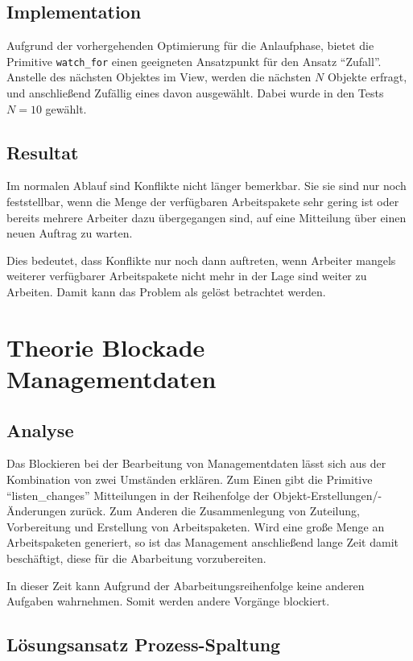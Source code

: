 \subsection{Implementation}

Aufgrund der vorhergehenden Optimierung für die Anlaufphase,
bietet die Primitive \verb|watch_for| einen geeigneten Ansatzpunkt für den Ansatz ``Zufall''.
Anstelle des nächsten Objektes im View, werden die nächsten $N$ Objekte erfragt,
und anschließend Zufällig eines davon ausgewählt.
Dabei wurde in den Tests $N = 10$ gewählt.

\subsection{Resultat}
Im normalen Ablauf sind Konflikte nicht länger bemerkbar.
Sie sie sind nur noch feststellbar, wenn die Menge der verfügbaren Arbeitspakete
sehr gering ist oder bereits mehrere Arbeiter dazu übergegangen sind,
auf eine Mitteilung über einen neuen Auftrag zu warten.

Dies bedeutet, dass Konflikte nur noch dann auftreten,
wenn Arbeiter mangels weiterer verfügbarer Arbeitspakete nicht mehr in der Lage sind weiter zu Arbeiten. Damit kann das Problem als gelöst betrachtet werden.

\section{Theorie Blockade Managementdaten}
\subsection{Analyse}
Das Blockieren bei der Bearbeitung von Managementdaten lässt sich
aus der Kombination von zwei Umständen erklären.
Zum Einen gibt die Primitive ``listen\_changes'' Mitteilungen
in der Reihenfolge der Objekt-Erstellungen/-Änderungen zurück.
Zum Anderen die Zusammenlegung von Zuteilung, Vorbereitung
und Erstellung von Arbeitspaketen.
Wird eine große Menge an Arbeitspaketen generiert,
so ist das Management anschließend lange Zeit damit beschäftigt,
diese für die Abarbeitung vorzubereiten.

In dieser Zeit kann Aufgrund der Abarbeitungsreihenfolge
keine anderen Aufgaben wahrnehmen.
Somit werden andere Vorgänge blockiert.

\subsection{Lösungsansatz Prozess-Spaltung}

